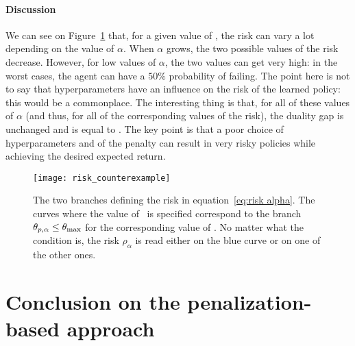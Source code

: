\paragraph{Discussion} We can see on Figure~\ref{fig:risk plot} that, for a given value of \Deltatarget, the risk can vary a lot depending on the value of $\alpha$. When $\alpha$ grows, the two possible values of the risk decrease. However, for low values of $\alpha$, the two values can get very high: in the worst cases, the agent can have a $50\%$ probability of failing. The point here is not to say that hyperparameters have an influence on the risk of the learned policy: this would be a commonplace. The interesting thing is that, for all of these values of $\alpha$ (and thus, for all of the corresponding values of the risk), the duality gap is unchanged and is equal to \Deltatarget. The key point is that a poor choice of hyperparameters and of the penalty can result in very risky policies while achieving the desired expected return.

\begin{figure}
	\centering
	\texttt{[image: risk\_counterexample]}
	\caption{The two branches defining the risk in equation~\eqref{eq:risk alpha}. The curves where the value of \Deltatarget~is specified correspond to the branch $\theta_{p, \alpha}\leq\theta_\text{max}$ for the corresponding value of \Deltatarget. No matter what the condition is, the risk $\rho_\alpha$ is read either on the blue curve or on one of the other ones.}
	\label{fig:risk plot}
\end{figure}

\section{Conclusion on the penalization-based approach}

